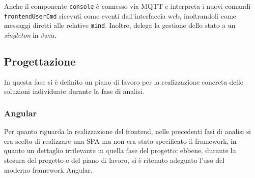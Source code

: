 % 


Anche il componente \texttt{console} è connesso via MQTT e interpreta i nuovi comandi \texttt{frontendUserCmd} ricevuti come eventi dall'interfaccia web, inoltrandoli come messaggi diretti alle relative \texttt{mind}.
Inoltre, delega la gestione dello stato a un \textit{singleton} in Java.

\subsection{Progettazione}

In questa fase si è definito un piano di lavoro per la realizzazione concreta delle soluzioni individuate durante la fase di analisi.

\subsubsection{Angular}

Per quanto riguarda la realizzazione del frontend, nelle precedenti fasi di analisi si era scelto di realizzare una SPA ma non era stato specificato il framework, in quanto un dettaglio irrilevante in quella fase del progetto;
ebbene, durante la stesura del progetto e del piano di lavoro, si è ritenuto adeguato l'uso del moderno framework Angular.

